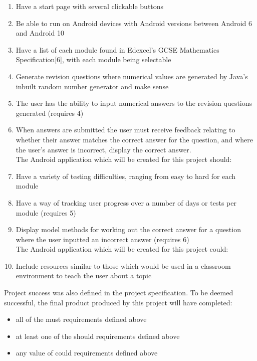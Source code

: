 \documentclass{article}
\begin{document}
\begin{enumerate}
	\item Have a start page with several clickable buttons
	\item Be able to run on Android devices with Android versions between Android 6 and Android 10
	\item Have a list of each module found in Edexcel's GCSE Mathematics Specification[6], with each module being selectable
	\item Generate revision questions where numerical values are generated by Java's inbuilt random number generator and make sense
	\item The user has the ability to input numerical answers to the revision questions generated (requires 4)
	\item When answers are submitted the user must receive feedback relating to whether	their answer matches the correct answer for the question, and where the user’s answer is incorrect, display the correct answer. \\
	
	The Android application which will be created for this project should:
	\item Have a variety of testing difficulties, ranging from easy to hard for each module
	\item Have a way of tracking user progress over a number of days or tests per module (requires 5)
	\item Display model methods for working out the correct answer for a question where the user inputted an incorrect answer (requires 6) \\
	
	The Android application which will be created for this project could:
	\item Include resources similar to those which would be used in a classroom environment to teach the user about a topic
\end{enumerate}

Project success was also defined in the project specification. To be deemed successful, the final product produced by this project will have completed: 

\begin{itemize}
	\item all of the must requirements defined above
	\item at least one of the should requirements defined above
	\item any value of could requirements defined above
\end{itemize}
\end{document}

